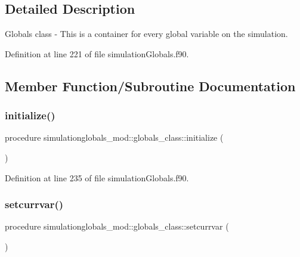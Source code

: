 \subsection{Detailed Description}
Globals class -\/ This is a container for every global variable on the simulation. 

Definition at line 221 of file simulation\+Globals.\+f90.



\subsection{Member Function/\+Subroutine Documentation}
\mbox{\label{structsimulationglobals__mod_1_1globals__class_a3b8fe335ee4571c73b774cbbe37820cf}} 
\subsubsection{\texorpdfstring{initialize()}{initialize()}}
{\footnotesize\ttfamily procedure simulationglobals\+\_\+mod\+::globals\+\_\+class\+::initialize (\begin{DoxyParamCaption}{ }\end{DoxyParamCaption})\hspace{0.3cm}{\ttfamily [private]}}



Definition at line 235 of file simulation\+Globals.\+f90.

\mbox{\label{structsimulationglobals__mod_1_1globals__class_ae1d8dcce038856889fec915c28a054ce}} 
\subsubsection{\texorpdfstring{setcurrvar()}{setcurrvar()}}
{\footnotesize\ttfamily procedure simulationglobals\+\_\+mod\+::globals\+\_\+class\+::setcurrvar (\begin{DoxyParamCaption}{ }\end{DoxyParamCaption})\hspace{0.3cm}{\ttfamily [private]}}



